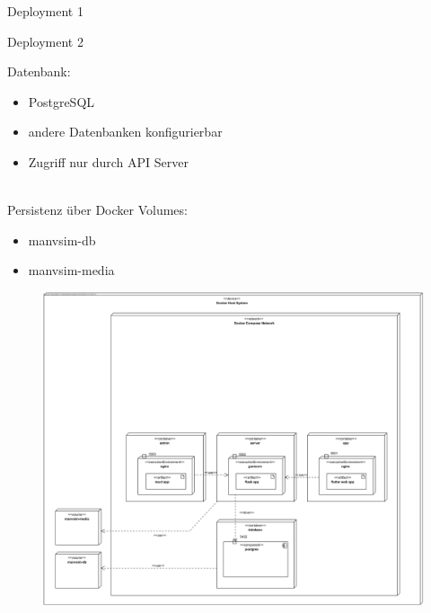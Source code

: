 \begin{frame}{Deployment 1}
\begin{minipage}[t]{0.63\textwidth}
\begin{figure}
\begin{center}
            \end{center}
        \end{figure}
    \end{minipage}
\end{frame}

\begin{frame}{Deployment 2}
    \begin{minipage}[t]{0.35\textwidth}
        Datenbank:
        \begin{itemize}
            \item PostgreSQL
            \item andere Datenbanken konfigurierbar
            \item Zugriff nur durch API Server
        \end{itemize}
        $ $\\
        Persistenz über Docker Volumes:
        \begin{itemize}
            \item manvsim-db
            \item manvsim-media
        \end{itemize}
    \end{minipage}
    \hfill
    \begin{minipage}[t]{0.63\textwidth}
        \begin{figure}
            \begin{center}
                \includegraphics[width=\textwidth]{images/deployment/deployment_diagram_database.jpg}
            \end{center}
        \end{figure}
    \end{minipage}
\end{frame}

